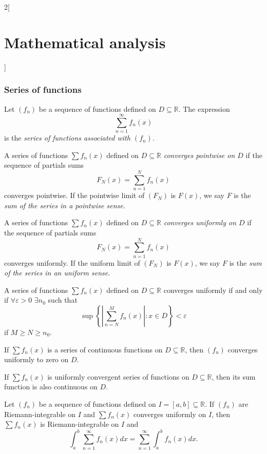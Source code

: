 \documentclass[../../../main.tex]{subfiles}
\begin{document}
\begin{multicols}{2}[\section{Mathematical analysis}]
\subsubsection*{Series of functions}
\begin{definition}
Let $(f_n)$ be a sequence of functions defined on $D\subseteq\mathbb{R}$. The expression $$\sum_{n=1}^\infty f_n(x)$$ is the \textit{series of functions associated with $(f_n)$}.
\end{definition}
\begin{definition}
A series of functions $\sum f_n(x)$ defined on $D\subseteq\mathbb{R}$ \textit{converges pointwise on $D$} if the sequence of partials sums $$F_N(x)=\sum_{n=1}^Nf_n(x)$$ converges pointwise. If the pointwise limit of $(F_N)$ is $F(x)$, we say $F$ is the \textit{sum of the series in a pointwise sense}.
\end{definition}
\begin{definition}
A series of functions $\sum f_n(x)$ defined on $D\subseteq\mathbb{R}$ \textit{converges uniformly on $D$} if the sequence of partials sums $$F_N(x)=\sum_{n=1}^Nf_n(x)$$ converges uniformly. If the uniform limit of $(F_N)$ is $F(x)$, we say $F$ is the \textit{sum of the series in an uniform sense}.
\end{definition}
\begin{theorem}
A series of functions $\sum f_n(x)$ defined on $D\subseteq\mathbb{R}$ converges uniformly if and only if $\forall\varepsilon>0$ $\exists n_0$ such that $$\sup\left\{\left|\sum_{n=N}^Mf_n(x)\right|:x\in D\right\}< \varepsilon$$ if $M\geq N\geq n_0$.
\end{theorem}
\begin{corollary}
If $\sum f_n(x)$ is a series of continuous functions on $D\subseteq\mathbb{R}$, then $(f_n)$ converges uniformly to zero on $D$.
\end{corollary}
\begin{theorem}
If $\sum f_n(x)$ is uniformly convergent series of functions on $D\subseteq\mathbb{R}$, then its sum function is also continuous on $D$.
\end{theorem}
\begin{theorem}
Let $(f_n)$ be a sequence of functions defined on $I=[a,b]\subseteq\mathbb{R}$. If $(f_n)$ are Riemann-integrable on $I$ and $\sum f_n(x)$ converges uniformly on $I$, then $\sum f_n(x)$ is Riemann-integrable on $I$ and $$\int_a^b\sum_{n=1}^\infty f_n(x) dx=\sum_{n=1}^\infty \int_a^bf_n(x) dx.$$
\end{theorem}
\begin{theorem}

\end{theorem}
\end{multicols}
\end{document}
